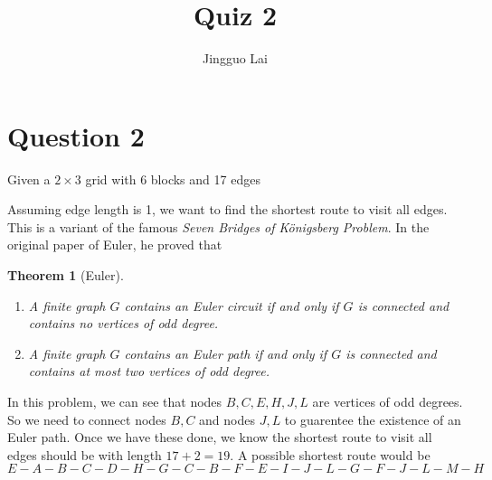 \documentclass[a4paper, 11pt]{amsart}
\newtheorem*{theorem*}{Theorem}
\theoremstyle{remark}
\numberwithin{equation}{section}
\begin{document}
\title[Quiz 2]{Quiz 2}

\author{Jingguo Lai}
\address{Department of Mathematics and Computer Science\\ Brown University \\ Providence, RI 02912}
\maketitle

\section*{Question 2}
Given a $2\times 3$ grid with 6 blocks and 17 edges\\
\begin{center}
\end{center}
Assuming edge length is 1, we want to find the shortest route to visit all edges. This is a variant of the famous \emph{Seven Bridges of K\"{o}nigsberg Problem}. In the original paper of Euler, he proved that
\begin{theorem*}[Euler]
\begin{enumerate}
\item A finite graph $G$ contains an Euler circuit if and only if $G$ is connected and contains no vertices of odd degree.
\item A finite graph $G$ contains an Euler path if and only if $G$ is connected and contains at most two vertices of odd degree.
\end{enumerate}
\end{theorem*}

In this problem, we can see that nodes $B, C, E, H, J, L$ are vertices of odd degrees. So we need to connect nodes $B, C$ and nodes $J, L$ to guarentee the existence of an Euler path. Once we have these done, we know the shortest route to visit all edges should be with length $17+2 = 19$. A possible shortest route would be
$$E-A-B-C-D-H-G-C-B-F-E-I-J-L-G-F-J-L-M-H$$
\end{document}
